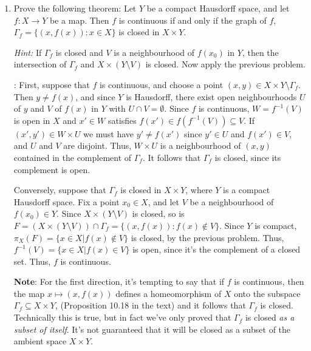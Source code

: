 \documentclass[letterpaper,12pt]{article}
\begin{document}
\begin{enumerate}
\bigskip

 \item Prove the following theorem: Let $Y$ be a compact Hausdorff space, and let $f:X\to Y$ be a map. Then $f$ is continuous if and only if the graph of $f$, $\Gamma_f = \{(x,f(x)) : x\in X\}$ is closed in $X\times Y$.

{\em Hint:} If $\Gamma_f$ is closed and $V$ is a neighbourhood of $f(x_0)$ in $Y$, then the intersection of $\Gamma_f$ and $X\times (Y\setminus V)$ is closed. Now apply the previous problem.

\bigskip

: First, suppose that $f$ is continuous, and choose a point $(x,y)\in X\times Y\setminus \Gamma_f$. Then $y\neq f(x)$, and since $Y$ is Hausdorff, there exist open neighbourhoods $U$ of $y$ and $V$ of $f(x)$ in $Y$ with $U\cap V=\emptyset$. Since $f$ is continuous, $W=f^{-1}(V)$ is open in $X$ and $x'\in W$ satisfies $f(x')\in f(f^{-1}(V))\subseteq V$. If $(x',y')\in W\times U$ we must have $y'\neq f(x')$ since $y'\in U$ and $f(x')\in V$, and $U$ and $V$ are disjoint. Thus, $W\times U$ is a neighbourhood of $(x,y)$ contained in the complement of $\Gamma_f$. It follows that $\Gamma_f$ is closed, since its complement is open.

Conversely, suppose that $\Gamma_f$ is closed in $X\times Y$, where $Y$ is a compact Hausdorff space. Fix a point $x_0\in X$, and let $V$ be a neighbourhood of $f(x_0)\in Y$. Since $X\times (Y\setminus V)$ is closed, so is $F=(X\times (Y\setminus V))\cap \Gamma_f=\{(x,f(x)):f(x)\notin V\}$. Since $Y$ is compact, $\pi_X(F)=\{x\in X | f(x)\notin V\}$ is closed, by the previous problem. Thus, $f^{-1}(V) = \{x\in X|f(x)\in V\}$ is open, since it's the complement of a closed set. Thus, $f$ is continuous.

{\bf Note}: For the first direction, it's tempting to say that if $f$ is continuous, then the map $x\mapsto (x,f(x))$ defines a homeomorphism of $X$ onto the subspace $\Gamma_f\subseteq X\times Y$, (Proposition 10.18 in the text) and it follows that $\Gamma_f$ is closed. Technically this is true, but in fact we've only proved that $\Gamma_f$ is closed {\em as a subset of itself}. It's not guaranteed that it will be closed as a subset of the ambient space $X\times Y$.


\end{enumerate}
\end{document}
